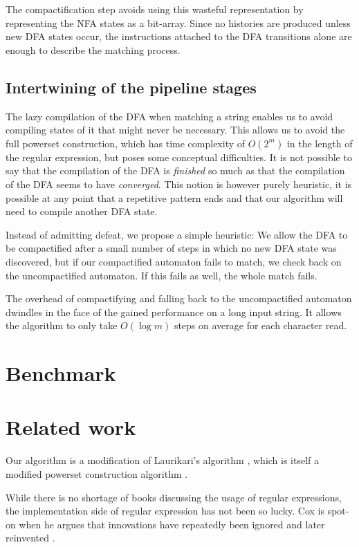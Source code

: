 \documentclass[english]{sigplanconf}
\theoremstyle{definition}
\begin{document}
The compactification step avoids using this wasteful representation
by representing the NFA states as a bit-array. Since no histories
are produced unless new DFA states occur, the instructions attached to
the DFA transitions alone are enough to describe the matching process.

\subsection{Intertwining of the pipeline stages}
The lazy compilation of the DFA when matching a string enables us
to avoid compiling states of it that might never be necessary. This
allows us to avoid the full powerset construction, which has 
time complexity of $O(2^m)$ in the length of the regular
expression, but poses some conceptual difficulties. It is not possible 
to say that the compilation of the DFA is \emph{finished} so much as
that the compilation of the DFA seems to have \emph{converged}.
This notion is however purely heuristic, it is possible at any point
that a repetitive pattern ends and that our algorithm will need to 
compile another DFA state.

Instead of admitting defeat, we propose a simple heuristic: We allow
the DFA to be compactified after a small number of steps in which
no new DFA state was discovered, but if our compactified automaton
fails to match, we check back on the uncompactified automaton. If this
fails as well, the whole match fails.

The overhead of compactifying and falling back to the uncompactified
automaton dwindles in the face of the gained performance on a long
input string. It allows the algorithm to only take $O(\log m)$ steps
on average for each character read.

\section{Benchmark}


\section{Related work}
Our algorithm is a modification of Laurikari's algorithm \cite{laurikari2000nfas},
which is itself a modified powerset construction algorithm \cite[p. 55]{Sipser2005}.

While there is no shortage of books discussing the usage of regular
expressions, the implementation side of regular expression has not
been so lucky. Cox is spot-on when he argues that innovations have
repeatedly been ignored and later reinvented \cite{Cox07a,Cox09a,Cox10a}. 
\end{document}
